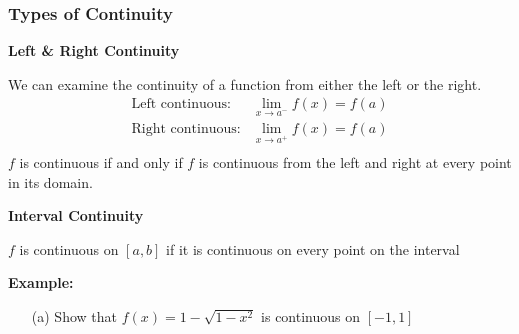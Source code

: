\documentclass{beamer}
\begin{document}
\begin{frame}
\frametitle{\textbf{Types of Continuity}}
\textbf{Left \& Right Continuity}

We can examine the continuity of a function from either the left or the right.
\begin{eqnarray*}
	\mbox{Left continuous}: & \lim\limits_{x \to a^-} f(x) = f(a)\\
	\mbox{Right continuous}: & \lim\limits_{x \to a^+} f(x) = f(a)\\
\end{eqnarray*}$f$ is continuous if and only if $f$ is continuous from the left and right at every point in its domain.
\vspace{12pt}

\textbf{Interval Continuity}

$f$ is continuous on $[a,b]$ if it is continuous on every point on the interval

\vspace{12pt}

\textbf{Example:}
\begin{itemize}
	\item[(a)] Show that $f(x) = 1-\sqrt{1-x^2}$ is continuous on $[-1,1]$
\end{itemize}
\end{frame}

%		
%		
%
%
%
%
\end{document}
